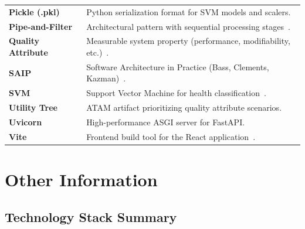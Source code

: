 \documentclass[11pt,a4paper,oneside]{report}
\begin{document}
\begin{longtable}{>{\bfseries\footnotesize}p{3.5cm} >{\footnotesize}p{10cm}}
\rowcolor{tablerow}
Pickle (.pkl) & Python serialization format for SVM models and scalers. \\
Pipe-and-Filter & Architectural pattern with sequential processing stages~\cite{shaw1996}. \\
\rowcolor{tablerow}
Quality Attribute & Measurable system property (performance, modifiability, etc.)~\cite{bass2024}. \\
SAIP & Software Architecture in Practice (Bass, Clements, Kazman)~\cite{bass2024}. \\
\rowcolor{tablerow}
SVM & Support Vector Machine for health classification~\cite{cortes1995svm}. \\
Utility Tree & ATAM artifact prioritizing quality attribute scenarios. \\
\rowcolor{tablerow}
Uvicorn & High-performance ASGI server for FastAPI. \\
Vite & Frontend build tool for the React application~\cite{react2024}. \\

\end{longtable}


\chapter{Other Information}

\section{Technology Stack Summary}
\end{document}
